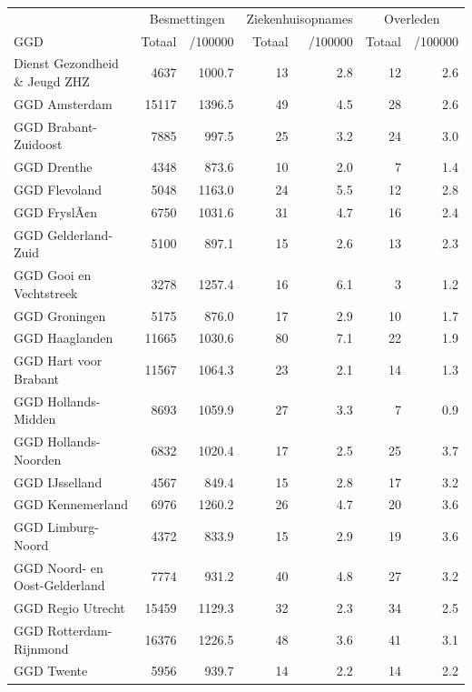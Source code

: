 \documentclass[
  english,
  man,floatsintext]{apa6}
\begin{document}
\begin{table}
\centering\begingroup\fontsize{10}{12}\selectfont

\begin{threeparttable}
\begin{tabular}{lrrrrrr}
\toprule
\multicolumn{1}{c}{ } & \multicolumn{2}{c}{Besmettingen} & \multicolumn{2}{c}{Ziekenhuisopnames} & \multicolumn{2}{c}{Overleden} \\
\cmidrule(l{3pt}r{3pt}){2-3} \cmidrule(l{3pt}r{3pt}){4-5} \cmidrule(l{3pt}r{3pt}){6-7}
GGD & Totaal & /100000 & Totaal & /100000 & Totaal & /100000\\
\midrule
Dienst Gezondheid \& Jeugd ZHZ & 4637 & 1000.7 & 13 & 2.8 & 12 & 2.6\\
GGD Amsterdam & 15117 & 1396.5 & 49 & 4.5 & 28 & 2.6\\
GGD Brabant-Zuidoost & 7885 & 997.5 & 25 & 3.2 & 24 & 3.0\\
GGD Drenthe & 4348 & 873.6 & 10 & 2.0 & 7 & 1.4\\
GGD Flevoland & 5048 & 1163.0 & 24 & 5.5 & 12 & 2.8\\
GGD FryslÃ¢n & 6750 & 1031.6 & 31 & 4.7 & 16 & 2.4\\
GGD Gelderland-Zuid & 5100 & 897.1 & 15 & 2.6 & 13 & 2.3\\
GGD Gooi en Vechtstreek & 3278 & 1257.4 & 16 & 6.1 & 3 & 1.2\\
GGD Groningen & 5175 & 876.0 & 17 & 2.9 & 10 & 1.7\\
GGD Haaglanden & 11665 & 1030.6 & 80 & 7.1 & 22 & 1.9\\
GGD Hart voor Brabant & 11567 & 1064.3 & 23 & 2.1 & 14 & 1.3\\
GGD Hollands-Midden & 8693 & 1059.9 & 27 & 3.3 & 7 & 0.9\\
GGD Hollands-Noorden & 6832 & 1020.4 & 17 & 2.5 & 25 & 3.7\\
GGD IJsselland & 4567 & 849.4 & 15 & 2.8 & 17 & 3.2\\
GGD Kennemerland & 6976 & 1260.2 & 26 & 4.7 & 20 & 3.6\\
GGD Limburg-Noord & 4372 & 833.9 & 15 & 2.9 & 19 & 3.6\\
GGD Noord- en Oost-Gelderland & 7774 & 931.2 & 40 & 4.8 & 27 & 3.2\\
GGD Regio Utrecht & 15459 & 1129.3 & 32 & 2.3 & 34 & 2.5\\
GGD Rotterdam-Rijnmond & 16376 & 1226.5 & 48 & 3.6 & 41 & 3.1\\
GGD Twente & 5956 & 939.7 & 14 & 2.2 & 14 & 2.2\\

\end{tabular}
\end{threeparttable}
\end{table}
\end{document}
